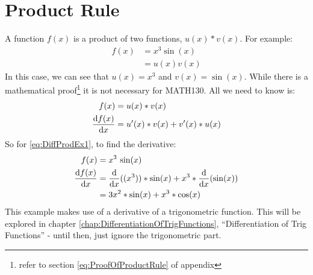 \section{Product Rule}
\label{sec:ProductRule}
A function $f(x)$ is a product of two functions, $u(x) * v(x)$. For example:
\begin{align}
  f(x) & = {x}^{3} \sin(x) \label{eq:DiffProdEx1}\\
       & = u(x)v(x)
\end{align}
In this case, we can see that $u(x) = {x}^{3}$ and $v(x) = \sin(x)$. While there
is a mathematical proof\footnote{refer to section \ref{eq:ProofOfProductRule} of
appendix} it is not necessary for MATH130. All we need to know is:
\begin{align}
             f(x) & = u(x)*v(x) \\
  \deriv{f(x)}{x} & = u'(x)*v(x) + v'(x)*u(x)
\end{align}
So for \ref{eq:DiffProdEx1}, to find the derivative:
\begin{align}
             f(x) & = {x}^{3}\,\sin(x) \nonumber \\
  \deriv{f(x)}{x} & = \lderiv{({x}^{3})}{x} * \sin(x) + {x}^{3} * \lderiv{\sin(x)}{x} \\
                  & = {3x}^{2}*\sin(x) + {x}^{3}*\cos(x)
\end{align}
This example makes use of a derivative of a trigonometric function. This will be
explored in chapter \ref{chap:DifferentiationOfTrigFunctions}, ``Differentiation
of Trig Functions'' - until then, just ignore the trigonometric part.
